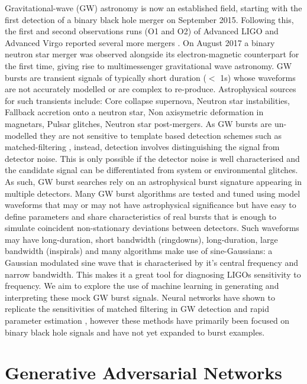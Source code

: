\documentclass[12pt]{iopart}
\begin{document}
Gravitational-wave (GW) astronomy is now an established field, starting with the first detection of a binary black hole merger \cite{Abbott2016} on September 2015. Following this, the first and second observations runs (O1 and O2) of Advanced LIGO and Advanced Virgo reported several more mergers \cite{Abbott2016a, Abbott2017, Abbott2017a, Abbott2017b}. On August 2017 a binary neutron star merger was observed alongside its electron-magnetic counterpart for the first time, giving rise to multimessenger gravitational wave astronomy. 
GW bursts are transient signals of typically short duration ($<$ 1s) whose waveforms are not accurately modelled or are complex to re-produce. Astrophysical sources for such transients include: Core collapse supernova, Neutron star instabilities, Fallback accretion onto a neutron star, Non axisymetric deformation in magnetars, Pulsar glitches, Neutron star post-mergers.
As GW bursts are un-modelled they are not sensitive to template based detection schemes such as matched-filtering \cite{Owen1998}, instead, detection involves distinguishing the signal from detector noise. This is only possible if the detector noise is well characterised and the candidate signal can be differentiated from system or environmental glitches. As such, GW burst searches rely on an astrophysical burst signature appearing in multiple detectors.
Many GW burst algorithms \cite{Klimenko_2008, Aso_2008} are tested and tuned using model waveforms that may or may not have astrophysical significance but have easy to define parameters and share characteristics of real bursts that is enough to simulate coincident non-stationary deviations between detectors. Such waveforms may have long-duration, short bandwidth (ringdowns), long-duration, large bandwidth (inspirals) and many algorithms make use of sine-Gaussians: a Gaussian modulated sine wave that is characterised by it's central frequency and narrow bandwidth. This makes it a great tool for diagnosing LIGOs sensitivity to frequency. 
We aim to explore the use of machine learning in generating and interpreting these mock GW burst signals. Neural networks have shown to replicate the sensitivities of matched filtering in GW detection \cite{Gabbard2017} and rapid parameter estimation \cite{gabbard2019bayesian}, however these methods have primarily been focused on binary black hole signals and have not yet expanded to burst examples. 

\section{Generative Adversarial Networks}
\end{document}

